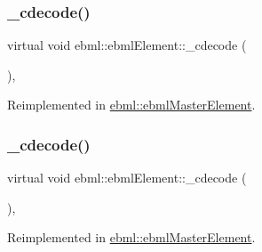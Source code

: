 \mbox{\label{classebml_1_1ebmlElement_a685441a87d36f6cfc844a72068b32c18}} 
\subsubsection{\texorpdfstring{\+\_\+cdecode()}{\_cdecode()}\hspace{0.1cm}{\footnotesize\ttfamily [1/2]}}
{\footnotesize\ttfamily virtual void ebml\+::ebml\+Element\+::\+\_\+cdecode (\begin{DoxyParamCaption}\item[{const \mbox{\hyperlink{classebml_1_1parseString}{parse\+String}} \&}]{ }\end{DoxyParamCaption})\hspace{0.3cm}{\ttfamily [protected]}, {\ttfamily [virtual]}}



Reimplemented in \mbox{\hyperlink{classebml_1_1ebmlMasterElement_a71a69b9b1f5fe071ec5c91867ea520a0}{ebml\+::ebml\+Master\+Element}}.

\mbox{\label{classebml_1_1ebmlElement_ab35f8705d2eec94a8af453cac0a53341}} 
\subsubsection{\texorpdfstring{\+\_\+cdecode()}{\_cdecode()}\hspace{0.1cm}{\footnotesize\ttfamily [2/2]}}
{\footnotesize\ttfamily virtual void ebml\+::ebml\+Element\+::\+\_\+cdecode (\begin{DoxyParamCaption}\item[{const \mbox{\hyperlink{classebml_1_1parseFile}{parse\+File}} \&}]{ }\end{DoxyParamCaption})\hspace{0.3cm}{\ttfamily [protected]}, {\ttfamily [virtual]}}



Reimplemented in \mbox{\hyperlink{classebml_1_1ebmlMasterElement_a4cc06e13186cec1fb00fca66b4a1f265}{ebml\+::ebml\+Master\+Element}}.

